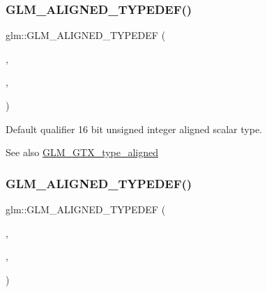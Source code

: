 \subsubsection{\texorpdfstring{G\+L\+M\+\_\+\+A\+L\+I\+G\+N\+E\+D\+\_\+\+T\+Y\+P\+E\+D\+E\+F()}{GLM\_ALIGNED\_TYPEDEF()}\hspace{0.1cm}{\footnotesize\ttfamily [106/209]}}
{\footnotesize\ttfamily glm\+::\+G\+L\+M\+\_\+\+A\+L\+I\+G\+N\+E\+D\+\_\+\+T\+Y\+P\+E\+D\+EF (\begin{DoxyParamCaption}\item[{\hyperlink{group__gtc__type__precision_gad8c2939e1fdd8e5828b31d95c52255d5}{uint16}}]{,  }\item[{aligned\+\_\+uint16}]{,  }\item[{2}]{ }\end{DoxyParamCaption})}

Default qualifier 16 bit unsigned integer aligned scalar type. \begin{DoxySeeAlso}{See also}
\hyperlink{group__gtx__type__aligned}{G\+L\+M\+\_\+\+G\+T\+X\+\_\+type\+\_\+aligned} 
\end{DoxySeeAlso}
\mbox{\label{group__gtx__type__aligned_gacf1744488c96ebd33c9f36ad33b2010a}} 
\subsubsection{\texorpdfstring{G\+L\+M\+\_\+\+A\+L\+I\+G\+N\+E\+D\+\_\+\+T\+Y\+P\+E\+D\+E\+F()}{GLM\_ALIGNED\_TYPEDEF()}\hspace{0.1cm}{\footnotesize\ttfamily [107/209]}}
{\footnotesize\ttfamily glm\+::\+G\+L\+M\+\_\+\+A\+L\+I\+G\+N\+E\+D\+\_\+\+T\+Y\+P\+E\+D\+EF (\begin{DoxyParamCaption}\item[{\hyperlink{group__gtc__type__precision_ga202b6a53c105fcb7e531f9b443518451}{uint32}}]{,  }\item[{aligned\+\_\+uint32}]{,  }\item[{4}]{ }\end{DoxyParamCaption})}

